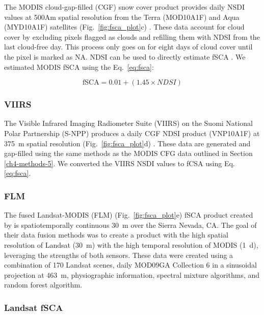 The MODIS cloud-gap-filled (CGF) snow cover product \citep{hallEvaluationMODISVIIRS2019} provides daily NSDI values at 500Am spatial resolution from the Terra (MOD10A1F) and Aqua (MYD10A1F) satellites (Fig.~\ref{fig:fsca_plot}c) . These data account for cloud cover by excluding pixels flagged as clouds and refilling them with NDSI from the last cloud-free day. This process only goes on for eight days of cloud cover until the pixel is marked as NA. NDSI can be used to directly estimate fSCA \citep{salomonsonEstimatingFractionalSnow2004, salomonsonDevelopmentAquaMODIS2006,stillingerLandsatMODISVIIRS2023}. We estimated MODIS fSCA using the Eq.~\ref{eq:fsca}:

\begin{equation}
\text{fSCA} = 0.01 + (1.45 \times NDSI)
\label{eq:fsca}
\end{equation}


\hypertarget{ch4-methods-6}{\subsubsection{VIIRS}\label{ch4-methods-6}}

The Visible Infrared Imaging Radiometer Suite (VIIRS) on the Suomi National Polar Partnership (S-NPP) produces a daily CGF NDSI product (VNP10A1F) at 375~m spatial resolution (Fig.~\ref{fig:fsca_plot}d) \citep{hallEvaluationMODISVIIRS2019}. These data are generated and gap-filled using the same methods as the MODIS CFG data outlined in Section \ref{ch4-methods-5}. We converted the VIIRS NSDI values to fCSA using Eq. \ref{eq:fsca}.


\hypertarget{ch4-methods-7}{\subsubsection{FLM}\label{ch4-methods-7}}

The fused Landsat-MODIS (FLM) (Fig.~\ref{fig:fsca_plot}e)  fSCA product created by \cite{rittgerMultisensorFusionUsing2021} is spatiotemporally continuous 30~m over the Sierra Nevada, CA. The goal of their data fusion methods was to create a product with the high spatial resolution of Landsat (30~m) with the high temporal resolution of MODIS (1~d), leveraging the strengths of both sensors. These data were created using a combination of 170 Landsat scenes, daily MOD09GA Collection 6 in a sinusoidal projection at 463~m, physiographic information, spectral mixture algorithms, and random forest algorithm. 

\hypertarget{ch4-methods-8}{\subsubsection{Landsat fSCA}\label{ch4-methods-8}}


